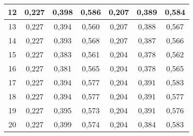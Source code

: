 \documentclass{article}
\begin{document}
\begin{center}
\begin{longtable}{c|c|c|c|c|c|c|}
\multicolumn{1}{|c|}{12}          & 0,227  & 0,398  & 0,586  & 0,207     & 0,389     & 0,584     \\ \hline
\multicolumn{1}{|c|}{13}          & 0,227  & 0,394  & 0,560  & 0,207     & 0,388     & 0,567     \\ \hline
\multicolumn{1}{|c|}{14}          & 0,227  & 0,393  & 0,568  & 0,207     & 0,387     & 0,566     \\ \hline
\multicolumn{1}{|c|}{15}          & 0,227  & 0,383  & 0,561  & 0,204     & 0,378     & 0,562     \\ \hline
\multicolumn{1}{|c|}{16}          & 0,227  & 0,381  & 0,565  & 0,204     & 0,378     & 0,565     \\ \hline
\multicolumn{1}{|c|}{17}          & 0,227  & 0,394  & 0,577  & 0,204     & 0,391     & 0,583     \\ \hline
\multicolumn{1}{|c|}{18}          & 0,227  & 0,394  & 0,577  & 0,204     & 0,391     & 0,577     \\ \hline
\multicolumn{1}{|c|}{19}          & 0,227  & 0,395  & 0,573  & 0,204     & 0,391     & 0,576     \\ \hline
\multicolumn{1}{|c|}{20}          & 0,227  & 0,399  & 0,574  & 0,204     & 0,384     & 0,583     \\ \hline
        
\end{longtable}
\end{center}
\end{document}
